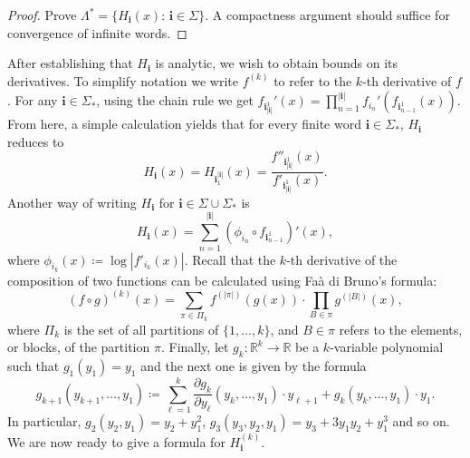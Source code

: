 \documentclass[12pt,]{article}
\theoremstyle{definition}
\theoremstyle{remark}
\renewcommand{\Bbb}[1]{\mathbb{#1}}
\newcommand{\bbR}{{\Bbb R}}        %
\newcommand{\0}{\mathbf{0}}
\newcommand{\bi}{\mathbf{i}}
\begin{document}
{\begin{proof}
{\color{red} Prove $\Lambda^*=\{H_{\bi}(x):\, \bi\in\Sigma\}$. A compactness argument should suffice
for convergence of infinite words.}
\end{proof}

After establishing that $H_{\bi}$ is analytic, we wish to obtain bounds on its derivatives. To
simplify notation we write $f^{(k)}$ to refer to the $k$-th derivative of $f$. 
For any $\bi\in\Sigma_*$, using the chain rule we get $f_{\bi_{|\bi|}^1}'(x)=
\prod_{n=1}^{|\bi|}f_{i_n}'(f_{\bi_{n-1}^1}(x))$. From here, a simple calculation yields %
that for every finite word $\bi\in\Sigma_*$, $H_{\bi}$ reduces to
\begin{equation}\label{eq:H=f''/f'}
H_{\bi}(x)=H_{\bi_1^{|\bi|}}(x) = \frac{f''_{\bi_{|\bi|}^1}(x)}{f'_{\bi_{|\bi|}^1}(x)}.
\end{equation}
Another way of writing $H_{\bi}$ for $\bi\in\Sigma\cup\Sigma_*$ is
\begin{equation}
	H_{\bi}(x) = \sum_{n=1}^{|\bi|} (\phi_{i_n}\circ f_{\bi_{n-1}^1})'(x),
	\label{eq:alternativeH}
\end{equation}
where $\phi_{i_k}(x)\coloneqq \log|f'_{i_k}(x)|$. Recall that the $k$-th derivative of the
composition of two functions can be calculated using Fa\`a di Bruno's formula:
\begin{equation}\label{eq:FaaDiBruno}
(f\circ g)^{(k)}(x) = \sum_{\pi\in \Pi_k} f^{(|\pi|)}(g(x)) \cdot \prod_{B\in\pi}
g^{(|B|)}(x),
\end{equation}
where $\Pi_k$ is the set of all partitions of $\{1,\dots,k\}$, and $B\in \pi$ refers to the
elements, or blocks, of the partition $\pi$. Finally, let $g_k:\bbR^k\to \bbR$ be a $k$-variable
polynomial such that $g_1(y_1)=y_1$ and the next one is given by the formula
\[
g_{k+1}(y_{k+1},\dots,y_1)\coloneqq \sum_{\ell=1}^k \frac{\partial g_k}{\partial
y_{\ell}}(y_k,\dots,y_1)\cdot y_{\ell+1} +
g_k(y_k,\dots,y_1)\cdot y_1.
\]
In particular, $g_2(y_2,y_1)=y_2+y_1^2$, $g_3(y_3,y_2,y_1) = y_3+3y_1y_2+y_1^3$ and so on. We are
now ready to give a formula for $H_{\bi}^{(k)}$.


}
\end{document}
